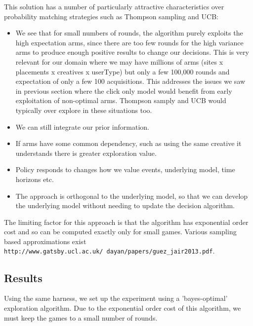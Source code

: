 \documentclass[12pt]{article}
\begin{document}
This solution has a number of particularly attractive characteristics over probability matching strategies such as Thompson sampling and UCB:
\begin{itemize}
	\item We see that for small numbers of rounds, the algorithm purely exploits the high expectation arms, since there are too few rounds for the high variance arms to produce enough positive results to change our decisions. This is very relevant for our domain where we may have millions of arms (sites x placements x creatives x userType) but only a few 100,000 rounds and expectation of only a few 100 acquisitions. This addresses the issues we saw in previous section where the click only model would benefit from early exploitation of non-optimal arms. Thompson samply and UCB would typically over explore in these situations too.
	\item We can still integrate our prior information.
	\item If arms have some common dependency, such as using the same creative it understands there is greater exploration value.
	\item Policy responds to changes how we value events, underlying model, time horizons etc.
	\item The approach is orthogonal to the underlying model, so that we can develop the underlying model without needing to update the decision algorithm.
\end{itemize}

The limiting factor for this approach is that the algorithm has exponential order cost and so can be computed exactly only for small games. Various sampling based approximations exist \texttt{http://www.gatsby.ucl.ac.uk/~dayan/papers/guez\_jair2013.pdf}. 

\subsection{Results}

Using the same harness, we set up the experiment using a 'bayes-optimal' exploration algorithm. Due to the exponential order cost of this algorithm, we must keep the games to a small number of rounds. 
\end{document}
